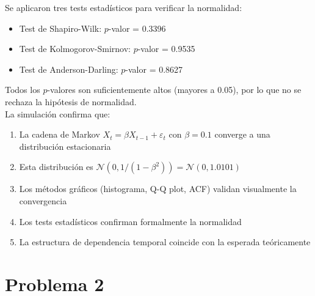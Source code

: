 \documentclass[12pt,a4paper]{article}
\begin{document}
Se aplicaron tres tests estadísticos para verificar la normalidad:
\begin{itemize}
    \item Test de Shapiro-Wilk: $p$-valor = 0.3396
    \item Test de Kolmogorov-Smirnov: $p$-valor = 0.9535
    \item Test de Anderson-Darling: $p$-valor = 0.8627
\end{itemize}

Todos los $p$-valores son suficientemente altos (mayores a 0.05), por lo que no se rechaza la hipótesis de normalidad. \\

La simulación confirma que:
\begin{enumerate}
    \item La cadena de Markov $X_t = \beta X_{t-1} + \varepsilon_t$ con $\beta = 0.1$ converge a una distribución estacionaria
    \item Esta distribución es $\mathcal{N}(0, 1/(1-\beta^2)) = \mathcal{N}(0, 1.0101)$
    \item Los métodos gráficos (histograma, Q-Q plot, ACF) validan visualmente la convergencia
    \item Los tests estadísticos confirman formalmente la normalidad
    \item La estructura de dependencia temporal coincide con la esperada teóricamente
\end{enumerate}

\section*{Problema 2}

\begin{center}
\end{center}
\end{document}
